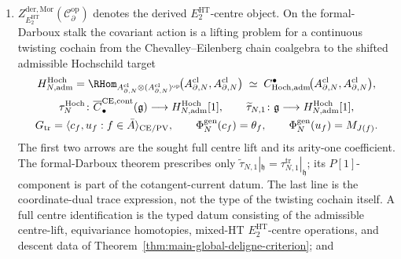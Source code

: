 \begin{thm}
\begin{enumerate}[label=\textup{(\roman*)}]
        equation is asserted: an \(r\)-matrix structure is independent
        Lie-coefficient data, and the scalar diagonal-kernel datum
        contains no such coefficient;
  \item \(Z^{\mathrm{der},\mathrm{Mor}}_{E_2^{\mathrm{HT}}}(
        \mathcal C^{\mathrm{op}}_\partial)\) denotes the derived
        \(E_2^{\mathrm{HT}}\)-centre object.  On the formal-Darboux
        stalk the covariant action is a lifting problem for a continuous
        twisting cochain from the Chevalley--Eilenberg chain coalgebra
        to the shifted admissible Hochschild target
\begin{equation}\label{eq:bar-resolution-derived-centre}
        \begin{gathered}
          H_{N,\mathrm{adm}}^{\mathrm{Hoch}}=
          \RHom_{A^{\mathrm{cl}}_{\partial,N}\otimes
                 (A^{\mathrm{cl}}_{\partial,N})^{\mathrm{op}}}\!\bigl(
	            A^{\mathrm{cl}}_{\partial,N},
	            A^{\mathrm{cl}}_{\partial,N}\bigr)
	          \;\simeq\;
	          C^\bullet_{\mathrm{Hoch},\mathrm{adm}}\!\bigl(
	            A^{\mathrm{cl}}_{\partial,N},
	            A^{\mathrm{cl}}_{\partial,N}\bigr),
          \\
	          \tau_N^{\mathrm{Hoch}}\colon
	          \overline C^{\mathrm{CE},\mathrm{cont}}_\bullet(\mathfrak g)
	          \longrightarrow H_{N,\mathrm{adm}}^{\mathrm{Hoch}}[1],
	          \qquad
	          \widetilde\tau_{N,1}\colon
	          \mathfrak g\longrightarrow
	          H_{N,\mathrm{adm}}^{\mathrm{Hoch}}[1],\\
	          G_{\mathrm{tr}}=
	          \langle c_f,u_f:f\in\bar A\rangle_{\mathrm{CE/PV}},
	          \qquad
	          \Phi_N^{\mathrm{gen}}(c_f)=\theta_f,\qquad
	          \Phi_N^{\mathrm{gen}}(u_f)=M_{J(f)}.
        \end{gathered}
\end{equation}
        The first two arrows are the sought full centre lift and its
        arity-one coefficient.  The formal-Darboux theorem prescribes
        only
        \(\widetilde\tau_{N,1}|_{\mathfrak h}
          =\tau_{N,1}^{\mathrm{tr}}|_{\mathfrak h}\);
        its \(P[1]\)-component is part of the cotangent-current datum.
        The last line is the coordinate-dual trace expression, not the
        type of the twisting cochain itself.
        A full centre identification is the typed datum consisting of
        the admissible centre-lift, equivariance homotopies, mixed-HT
        \(E_2^{\mathrm{HT}}\)-centre operations, and descent data of
        Theorem~\ref{thm:main-global-deligne-criterion}; and

\end{enumerate}
\end{thm}
